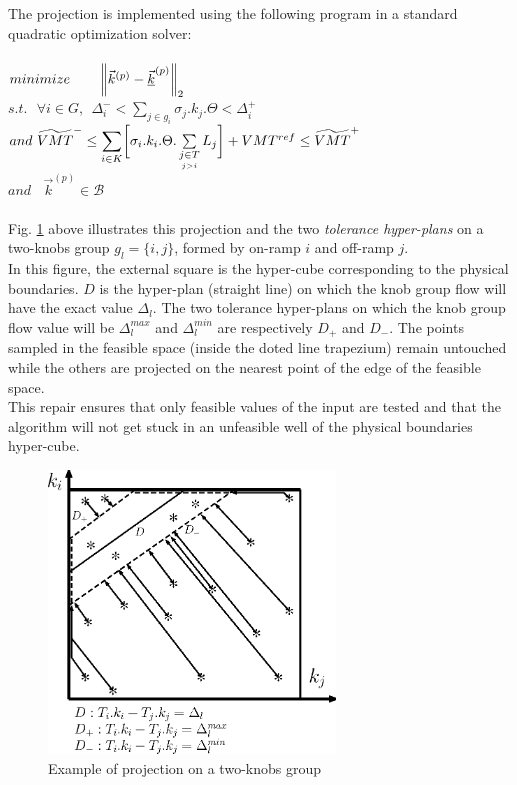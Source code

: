 The projection is implemented using the following program in a standard quadratic optimization solver:\\
\\
$minimize \ \ \ \ \ \ \norm{\vec{k}^{(p)}-\underline{\vec{k}}^{(p)}}_{2}$\\
$s.t.\ \ \ \forall i\in{G}, \ \ \Delta_{i}^{-}< \sum_{j\in{g_{i}}} \sigma_{j}.k_{j}.\Theta<\Delta_{i}^{+}$\\
$and\ \widetilde{VMT}^{-}\leq\mathlarger{\sum\limits_{i\in K}}\biggl[\sigma_{i}.k_{i}.\Theta.	\sum\limits_{\underset{j>i}{j\in T}}L_{j}\biggr]+VMT^{ref}\leq \widetilde{VMT}^{+}\nonumber $\\
$and\ \ \ \ \vec{k}^{(p)}\in \mathscr{B}$\\
\\
Fig. \ref{fig:proj} above illustrates this projection and the two \emph{tolerance hyper-plans} on a two-knobs group $g_{l}=\{i,j\}$, formed by on-ramp $i$ and off-ramp $j$.\\
In this figure, the external square is the hyper-cube corresponding to the physical boundaries. 
$D$ is the hyper-plan (straight line) on which the knob group flow will have the exact value $\Delta_{l}$.
The two tolerance hyper-plans on which the knob group flow value will be $\Delta_{l}^{max}$ and $\Delta_{l}^{min}$ are respectively $D_{+}$ and $D_{-}$. The points sampled in the feasible space (inside the doted line trapezium) remain untouched while the others are projected on the nearest point of the edge of the feasible space.\\
This repair ensures that only feasible values of the input are tested and that the algorithm will not get stuck in an unfeasible well of the physical boundaries hyper-cube.\\
\begin{figure}
\centering
\includegraphics[width=3in]{figures/proj.eps}
\caption{Example of projection on a two-knobs group}
\label{fig:proj}
\end{figure}
